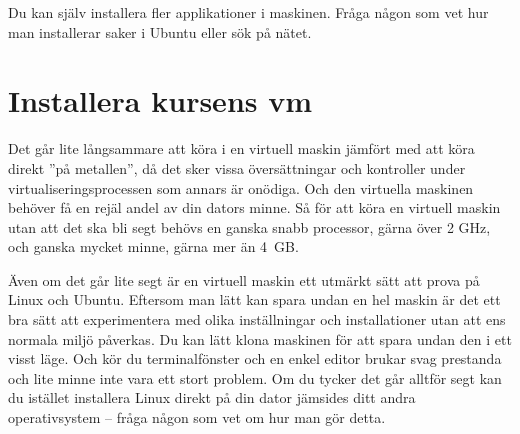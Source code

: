 Du kan själv installera fler applikationer i maskinen. Fråga någon som vet hur man installerar saker i Ubuntu eller sök på nätet.

\section{Installera kursens vm}

Det går lite långsammare att köra i en virtuell maskin jämfört med att köra direkt ''på metallen'', då det sker vissa översättningar och kontroller under virtualiseringsprocessen som annars är onödiga. Och den virtuella maskinen behöver få en rejäl andel av din dators minne. Så för att köra en virtuell maskin utan att det ska bli segt behövs en ganska snabb processor, gärna över 2 GHz, och ganska mycket minne, gärna mer än 4~GB. 

Även om det går lite segt är en virtuell maskin ett utmärkt sätt att prova på Linux och Ubuntu. Eftersom man lätt kan spara undan en hel maskin är det ett bra sätt att experimentera med olika inställningar och installationer utan att ens normala miljö påverkas. Du kan lätt klona maskinen för att spara undan den i ett visst läge. Och kör du terminalfönster och en enkel editor brukar svag prestanda och lite minne inte vara ett stort problem. Om du tycker det går alltför segt kan du istället installera Linux direkt på din dator jämsides ditt andra operativsystem -- fråga någon som vet om hur man gör detta. 

